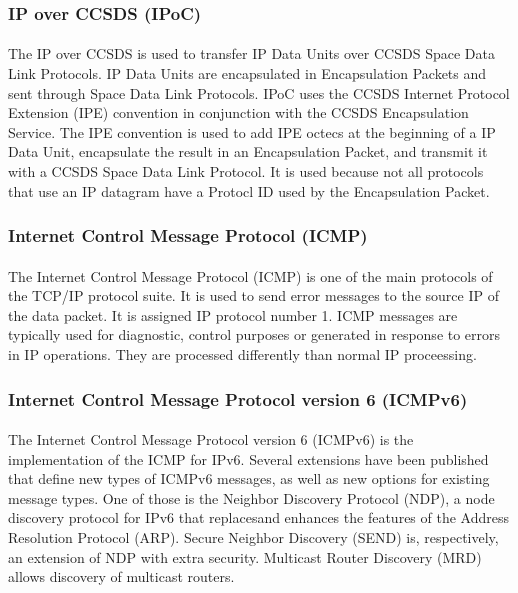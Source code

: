 \subsubsection*{IP over CCSDS (IPoC)\cite{IPoC}}
\paragraph{}The IP over CCSDS is used to transfer IP Data Units over CCSDS Space Data Link Protocols. IP Data Units are encapsulated in Encapsulation Packets and sent through Space Data Link Protocols. IPoC uses the CCSDS Internet Protocol
Extension (IPE) convention in conjunction with the CCSDS Encapsulation Service. The IPE convention is used to add IPE octecs at the beginning of a IP Data Unit, encapsulate the result in an Encapsulation Packet, and transmit it with a CCSDS Space Data Link Protocol. It is used because not all protocols that use an IP datagram have a Protocl ID used by the Encapsulation Packet.
\subsubsection*{Internet Control Message Protocol (ICMP)\cite{ICMP}}
\paragraph{}The Internet Control Message Protocol (ICMP) is one of the main protocols of the TCP/IP protocol suite. It is used to send error messages to the source IP of the data packet. It is assigned IP protocol number 1. ICMP messages are typically used for diagnostic, control purposes or generated in response to errors in IP operations. They are processed differently than normal IP proceessing.
\subsubsection*{Internet Control Message Protocol version 6 (ICMPv6)\cite{ICMPv6}}
\paragraph{}The Internet Control Message Protocol version 6 (ICMPv6) is the implementation of the ICMP for IPv6. Several extensions have been published that define new types of ICMPv6 messages, as well as new options for existing message types. One of those is the Neighbor Discovery Protocol (NDP), a node discovery protocol for IPv6 that replacesand enhances the features of the Address Resolution Protocol (ARP). Secure Neighbor Discovery (SEND) is, respectively, an extension of NDP with extra security. Multicast Router Discovery (MRD) allows discovery of multicast routers.

